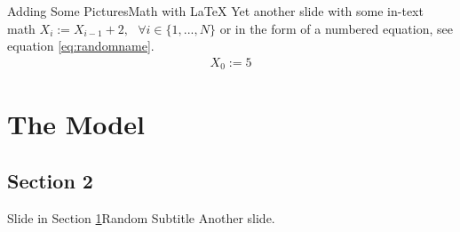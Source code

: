 \documentclass{beamer}
\begin{document}
\begin{frame}{Adding Some Pictures}{Math with \LaTeX}
  Yet another slide with some in-text math $X_{i}:=X_{i-1}+2, \text{ } \forall i \in \{1,...,N\}$ or in the form of a numbered equation, see equation \ref{eq:randomname}.
  \begin{align}
    X_{0} := 5
    \label{eq:randomname}
  \end{align}
\end{frame}

\section{The Model}
  \label{sec:model}

\subsection{Section 2}

\begin{frame}{Slide in Section \ref{sec:model}}{Random Subtitle}
  Another slide.
\end{frame}
\end{document}
